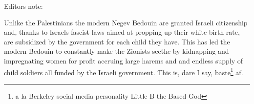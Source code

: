 \documentclass{article}
\begin{document}
\hfill \break
\noindent Editors note:

Unlike the Palestinians the modern Negev Bedouin are granted Israeli citizenship and, thanks to Israels fascist laws aimed at propping up their white birth rate, are subsidized by the government for each child they have. This has led the modern Bedouin to constantly make the Zionists seethe by kidnapping and impregnating women for profit accruing large harems and and endless supply of child soldiers all funded by the Israeli government. This is, dare I say, baste\footnote{a la Berkeley social media personality Little B the Based God} af.
\end{document}
